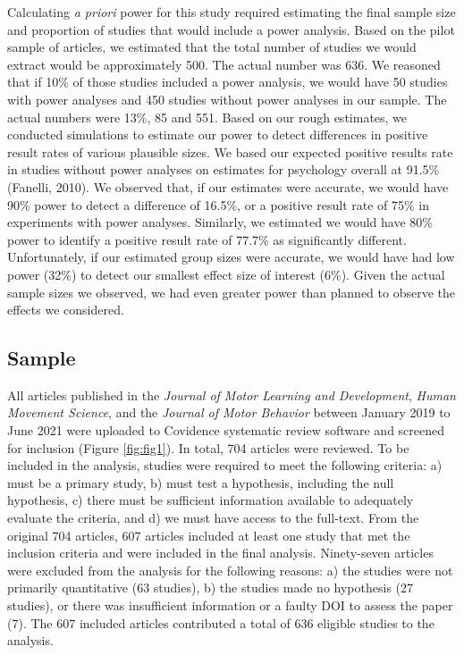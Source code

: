 \documentclass[
  doc, donotrepeattitle,floatsintext]{apa7}
\begin{document}
Calculating \emph{a priori} power for this study required estimating the final sample size and proportion of studies that would include a power analysis. Based on the pilot sample of articles, we estimated that the total number of studies we would extract would be approximately 500. The actual number was 636. We reasoned that if 10\% of those studies included a power analysis, we would have 50 studies with power analyses and 450 studies without power analyses in our sample. The actual numbers were 13\%, 85 and 551. Based on our rough estimates, we conducted simulations to estimate our power to detect differences in positive result rates of various plausible sizes. We based our expected positive results rate in studies without power analyses on estimates for psychology overall at 91.5\% (Fanelli, 2010). We observed that, if our estimates were accurate, we would have 90\% power to detect a difference of 16.5\%, or a positive result rate of 75\% in experiments with power analyses. Similarly, we estimated we would have 80\% power to identify a positive result rate of 77.7\% as significantly different. Unfortunately, if our estimated group sizes were accurate, we would have had low power (32\%) to detect our smallest effect size of interest (6\%). Given the actual sample sizes we observed, we had even greater power than planned to observe the effects we considered.

\hypertarget{sample}{%
\subsection{Sample}\label{sample}}

All articles published in the \emph{Journal of Motor Learning and Development}, \emph{Human Movement Science}, and the \emph{Journal of Motor Behavior} between January 2019 to June 2021 were uploaded to Covidence systematic review software and screened for inclusion (Figure \ref{fig:fig1}). In total, 704 articles were reviewed. To be included in the analysis, studies were required to meet the following criteria: a) must be a primary study, b) must test a hypothesis, including the null hypothesis, c) there must be sufficient information available to adequately evaluate the criteria, and d) we must have access to the full-text. From the original 704 articles, 607 articles included at least one study that met the inclusion criteria and were included in the final analysis. Ninety-seven articles were excluded from the analysis for the following reasons: a) the studies were not primarily quantitative (63 studies), b) the studies made no hypothesis (27 studies), or there was insufficient information or a faulty DOI to assess the paper (7). The 607 included articles contributed a total of 636 eligible studies to the analysis.
\end{document}
